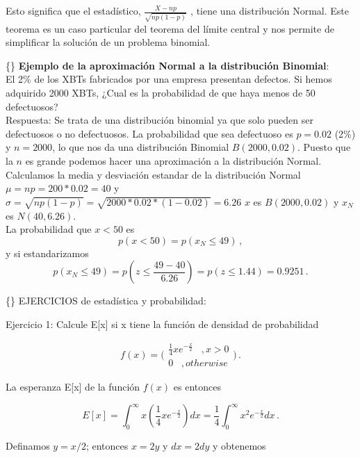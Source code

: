 \documentclass[
]{agujournal2019}
\begin{document}
Esto significa que el estadístico, \(\frac{X-np}{\sqrt{np(1-p)}}\) ,
tiene una distribución Normal. Este teorema es un caso particular del
teorema del límite central y nos permite de simplificar la solución de
un problema binomial.

\vspace{0.5cm}

\{\noindent\} \textbf{Ejemplo de la aproximación Normal a la
distribución Binomial}:\\

El 2\% de los XBTs fabricados por una empresa presentan defectos. Si
hemos adquirido 2000 XBTs, ¿Cual es la probabilidad de que haya menos de
50 defectuosos?\\

Respuesta: Se trata de una distribución binomial ya que solo pueden ser
defectuosos o no defectuosos. La probabilidad que sea defectuoso es
\(p=0.02\) (2\%) y \(n=2000\), lo que nos da una distribución Binomial
\(B(2000,0.02)\). Puesto que la \(n\) es grande podemos hacer una
aproximación a la distribución Normal. Calculamos la media y desviación
estandar de la distribución Normal \(\mu=np=200*0.02=40\) y
\(\sigma=\sqrt{np(1-p)}=\sqrt{2000*0.02*(1-0.02)}=6.26\) \(x\) es
\(B(2000,0.02)\) y \(x_N\) es \(N(40,6.26)\).\\
La probabilidad que \(x<50\) es \[p(x<50)=p(x_N\le 49)\,,\] y si
estandarizamos
\[p(x_N\le 49)=p\left(z\le \frac{49-40}{6.26} \right)=p(z\le 1.44)=0.9251\,.\]

\vspace{0.5cm}

\{\noindent\} EJERCICIOS de estadística y probabilidad:\\

\vspace{0.5cm}

Ejercicio 1: Calcule E{[}x{]} si x tiene la función de densidad de
probabilidad

\[ f(x)=\Bigg(\begin{array}{c}
 \frac{1}{4}xe^{-\frac{x}{2}}\,\,\,\,\,,x>0 \\ 0 \,\,\,\,\,,otherwise
\end{array})\,.\]

La esperanza E{[}x{]} de la función \(f(x)\) es entonces

\[E[x]=\int^\infty_0 x\left(\frac{1}{4}xe^{-\frac{x}{2}}\right)dx
      =\frac{1}{4}\int^\infty_0 x^2e^{-\frac{x}{2}}dx\,.\]

Definamos \(y=x/2\); entonces \(x=2y\) y \(dx=2dy\) y obtenemos
\end{document}

